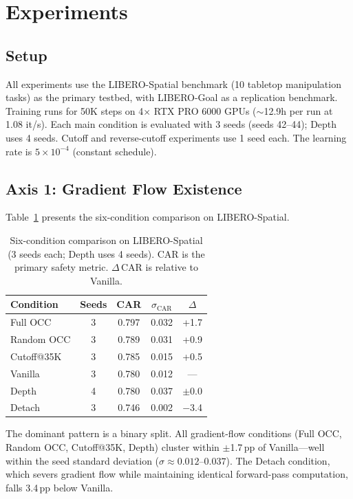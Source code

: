 \documentclass[10pt,twocolumn]{article}
\begin{document}
\section{Experiments}
\label{sec:exp}

\subsection{Setup}

All experiments use the LIBERO-Spatial benchmark (10 tabletop manipulation tasks) as the primary testbed, with LIBERO-Goal as a replication benchmark.
Training runs for 50K steps on 4$\times$ RTX PRO 6000 GPUs ($\sim$12.9h per run at 1.08 it/s).
Each main condition is evaluated with 3 seeds (seeds 42--44); Depth uses 4 seeds.
Cutoff and reverse-cutoff experiments use 1 seed each.
The learning rate is $5 \times 10^{-4}$ (constant schedule).

\subsection{Axis 1: Gradient Flow Existence}
\label{sec:axis1}

Table~\ref{tab:main} presents the six-condition comparison on LIBERO-Spatial.

\begin{table}[t]
\centering
\caption{Six-condition comparison on LIBERO-Spatial (3 seeds each; Depth uses 4 seeds). CAR is the primary safety metric. $\Delta$\,CAR is relative to Vanilla.}
\label{tab:main}
\small
\begin{tabular}{@{}lcccc@{}}
\toprule
Condition & Seeds & CAR & $\sigma_\text{CAR}$ & $\Delta$ \\
\midrule
Full OCC        & 3 & 0.797 & 0.032 & +1.7 \\
Random OCC      & 3 & 0.789 & 0.031 & +0.9 \\
Cutoff@35K      & 3 & 0.785 & 0.015 & +0.5 \\
Vanilla         & 3 & 0.780 & 0.012 & --- \\
Depth           & 4 & 0.780 & 0.037 & $\pm$0.0 \\
Detach          & 3 & 0.746 & 0.002 & $-$3.4 \\
\bottomrule
\end{tabular}
\end{table}

The dominant pattern is a binary split.
All gradient-flow conditions (Full OCC, Random OCC, Cutoff@35K, Depth) cluster within $\pm$1.7\,pp of Vanilla---well within the seed standard deviation ($\sigma \approx 0.012$--$0.037$).
The Detach condition, which severs gradient flow while maintaining identical forward-pass computation, falls 3.4\,pp below Vanilla.
\end{document}
